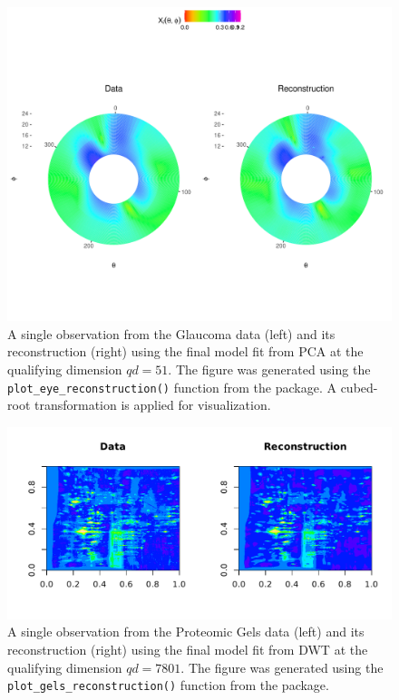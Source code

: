 \begin{figure}
    \centering
    \includegraphics[width=0.75\linewidth]{figures/eye-reconstruction.pdf}
    \caption{A single observation from the Glaucoma data (left) and its reconstruction (right) using the final model fit from PCA at the qualifying dimension $qd = 51$. The figure was generated using the \texttt{plot\_eye\_reconstruction()} function from the  package. A cubed-root transformation is applied for visualization.}
    \label{fig:eye-reconstruction}
\end{figure}

\begin{figure}
    \centering
    \includegraphics[width=0.75\linewidth]{figures/gels-reconstruction.pdf}
    \caption{A single observation from the Proteomic Gels data (left) and its reconstruction (right) using the final model fit from DWT at the qualifying dimension $qd = 7801$. The figure was generated using the \texttt{plot\_gels\_reconstruction()} function from the  package.}
    \label{fig:gels-reconstruction}
\end{figure}


